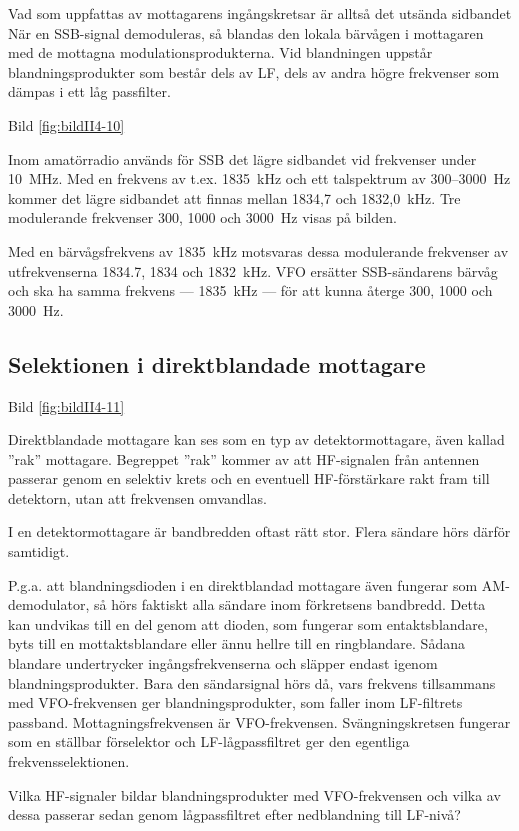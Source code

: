 Vad som uppfattas av mottagarens ingångskretsar är alltså det utsända
sidbandet När en SSB-signal demoduleras, så blandas den lokala
bärvågen i mottagaren med de mottagna modulationsprodukterna.  Vid
blandningen uppstår blandningsprodukter som består dels av LF, dels av
andra högre frekvenser som dämpas i ett låg passfilter.

Bild \ref{fig:bildII4-10}

Inom amatörradio används för SSB det lägre sidbandet vid frekvenser
under 10~MHz.  Med en frekvens av t.ex. 1835~kHz och ett talspektrum
av 300--3000~Hz kommer det lägre sidbandet att finnas mellan 1834,7 och
1832,0~kHz. Tre modulerande frekvenser 300, 1000 och 3000~Hz visas på
bilden.

Med en bärvågsfrekvens av 1835~kHz motsvaras dessa modulerande
frekvenser av utfrekvenserna 1834.7, 1834 och 1832~kHz. VFO ersätter
SSB-sändarens bärvåg och ska ha samma frekvens --- 1835~kHz --- för att
kunna återge 300, 1000 och 3000~Hz.

\subsection{Selektionen i direktblandade mottagare}

Bild \ref{fig:bildII4-11}

Direktblandade mottagare kan ses som en typ av detektormottagare, även
kallad ''rak'' mottagare. Begreppet ''rak'' kommer av att HF-signalen från
antennen passerar genom en selektiv krets och en eventuell
HF-förstärkare rakt fram till detektorn, utan att frekvensen omvandlas.

I en detektormottagare är bandbredden oftast rätt stor. Flera sändare
hörs därför samtidigt.

P.g.a. att blandningsdioden i en direktblandad mottagare även fungerar
som AM-demodulator, så hörs faktiskt alla sändare inom förkretsens
bandbredd. Detta kan undvikas till en del genom att dioden, som
fungerar som entaktsblandare, byts till en mottaktsblandare eller ännu
hellre till en ringblandare. Sådana blandare undertrycker
ingångsfrekvenserna och släpper endast igenom
blandningsprodukter. Bara den sändarsignal hörs då, vars frekvens
tillsammans med VFO-frekvensen ger blandningsprodukter, som faller
inom LF-filtrets passband. Mottagningsfrekvensen är
VFO-frekvensen. Svängningskretsen fungerar som en ställbar förselektor
och LF-lågpassfiltret ger den egentliga frekvensselektionen.

Vilka HF-signaler bildar blandningsprodukter med VFO-frekvensen och
vilka av dessa passerar sedan genom lågpassfiltret efter nedblandning
till LF-nivå?

